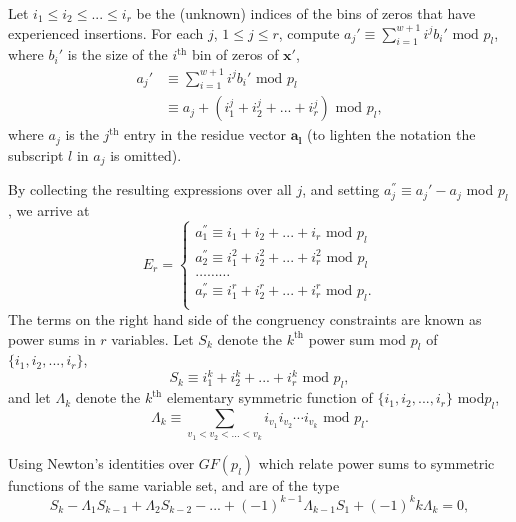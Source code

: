 Let $i_1 \leq i_2 \leq ... \leq i_r$ be the (unknown) indices of the
bins of zeros that have experienced insertions. For each $j$, $1\leq
j \leq r$, compute $a_j'\equiv \sum_{i=1}^{w+1} i^jb_i' \text{ mod }
p_l$, where $b_i'$ is the size of the $i^{\text{th}}$ bin of zeros
of $\mathbf{x'}$,
\begin{equation}\begin{array}{ll}
a_j'& \equiv \sum_{i=1}^{w+1} i^jb_i' \text{ mod } p_l\\
{}  & \equiv a_j + (i_1^j+i_2^j+...+i_r^j) \text{ mod }p_l,
\end{array}
\end{equation}
where $a_j$ is the $j^{\text{th}}$ entry in the residue vector
$\mathbf{a_l}$ (to lighten the notation the subscript $l$ in $a_j$
is omitted).

By collecting the resulting expressions over all $j$, and setting
$a_j^{''} \equiv a_j'-a_j$ mod $p_l$, we arrive at
\begin{equation}
E_r=\left\{
\begin{array}{ll}
a_1^{''} \equiv i_1+i_2+...+i_r \text{ mod }p_l\\
a_2^{''} \equiv i_1^2+i_2^2+...+i_r^2 \text{ mod }p_l\\
\dots \dots \dots\\
a_r^{''} \equiv i_1^r+i_2^r+...+i_r^r \text{ mod }p_l.\\
\end{array} \right.
\end{equation}
The terms on the right hand side of the congruency constraints are
known as power sums in $r$ variables. Let $S_k$ denote the
$k^{\text{th}}$ power sum mod $p_l$ of $\{i_1,i_2,...,i_r\}$,
\begin{equation}
S_k\equiv i_1^k+i_2^k+...+i_r^k \text{ mod }p_l,
\end{equation}
and let $\Lambda_k$ denote the $k^{\text{th}}$ elementary symmetric
function of  $\{i_1,i_2,...,i_r\}$ mod$p_l$,
\begin{equation}
\Lambda_k \equiv \sum_{v_1<v_2<...<v_k} i_{v_1}i_{v_2}\cdots i_{v_k}
\text{ mod } p_l.
\end{equation}

Using Newton's identities over $GF(p_l)$ which relate power sums to
symmetric functions of the same variable set, and are of the type
\begin{equation}\label{newton}
S_k-\Lambda_{1}S_{k-1}+\Lambda_{2}S_{k-2}-...+(-1)^{k-1}\Lambda_{k-1}S_{1}+(-1)^kk\Lambda_{k}
=0,
\end{equation}

